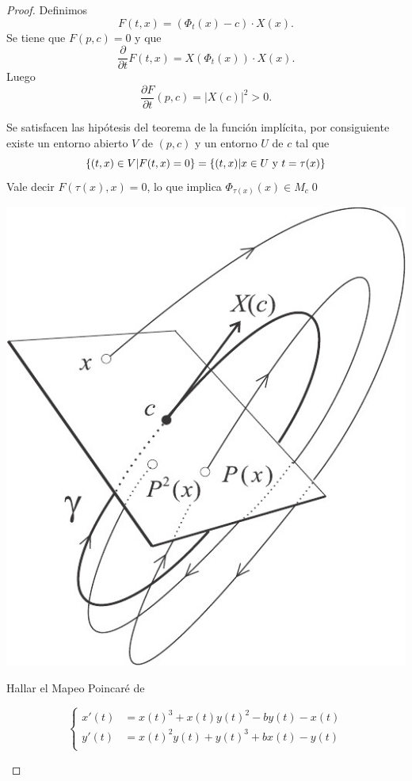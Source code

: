 \begin{proof} Definimos
\[F(t,x)=(\Phi_t(x)-c)\cdot X(x).\]
Se tiene que $F(p,c)=0$ y que
\[\frac{\partial}{\partial t}F(t,x)=X(\Phi_t(x))\cdot X(x).\]
Luego
\[\frac{\partial F}{\partial t}(p,c)=|X(c)|^2>0.\]


Se satisfacen las hipótesis del teorema de la función implícita, por consiguiente existe un entorno abierto $V$ de $(p,c)$  y un entorno $U$ de $c$ tal que
\[\{(t,x)\in V|F(t,x)=0\}=\{(t,x)|x\in U\hbox{ y }t=\tau(x)\}\]
Vale decir $F(\tau(x),x)=0$, lo que implica $\Phi_{\tau(x)}(x)\in M_c$\qed


 
   \begin{center}
   \includegraphics[scale=0.3]{imagenes/poincaremap.jpg}
   \end{center}


\begin{ejemplo} Hallar el Mapeo Poincaré de

 \[\begin{cases} x'(t)&= x\left(t\right)^{3} + x\left(t\right)
y\left(t\right)^{2} - b y\left(t\right) - x\left(t\right)\\
y'(t) &= x\left(t\right)^{2} y\left(t\right) +
y\left(t\right)^{3} + b x\left(t\right) - y\left(t\right)\\   
  \end{cases}\]



\end{ejemplo}
\end{proof}
